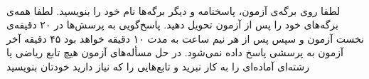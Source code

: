 \documentclass[12pt, a4paper]{article}
\author{Ahmad Yoosofan}
\date{\today}
\begin{document}
\pagestyle{empty}  %
\\ \raggedleft
لطفا روی برگه‌ی آزمون، پاسخنامه و دیگر برگه‌ها نام خود را بنویسید.
 لطفا همه‌ی برگه‌های خود را پس از آزمون تحویل دهید. پاسخ‌گویی به پرسش‌ها در ۲۰ دقیقه‌ی نخست آزمون و سپس پس از هر نیم ساعت به مدت ۱۰ دقیقه خواهد بود ۴۵ دقیقه آخر آزمون به پرسشی پاسخ داده نمی‌شود.
 در حل مسأله‌های آزمون هیچ تابع ریاضی یا رشته‌ای آماده‌ای را به کار نبرید و تابع‌هایی را که نیاز دارید خودتان بنویسید
\end{document}
